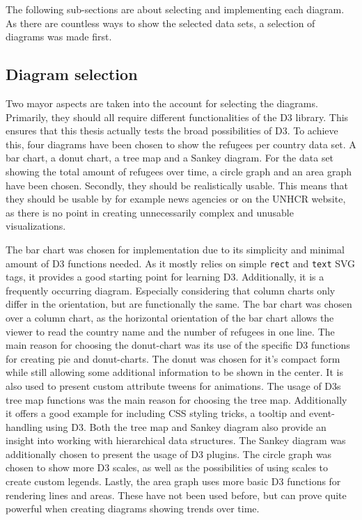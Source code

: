 The following sub-sections are about selecting and implementing each diagram. As there are countless ways to show the selected data sets, a selection of diagrams was made first.

\subsection{Diagram selection} \label{sec:diagram-selection}
Two mayor aspects are taken into the account for selecting the diagrams. Primarily, they should all require different functionalities of the D3 library. This ensures that this thesis actually tests the broad possibilities of D3. To achieve this, four diagrams have been chosen to show the refugees per country data set. A bar chart, a donut chart, a tree map and a Sankey diagram. For the data set showing the total amount of refugees over time, a circle graph and an area graph have been chosen.
Secondly, they should be realistically usable. This means that they should be usable by for example news agencies or on the UNHCR website, as there is no point in creating unnecessarily complex and unusable visualizations.

The bar chart was chosen for implementation due to its simplicity and minimal amount of D3 functions needed. As it mostly relies on simple \texttt{rect} and \texttt{text} SVG tags, it provides a good starting point for learning D3. Additionally, it is a frequently occurring diagram. Especially considering that column charts only differ in the orientation, but are functionally the same. The bar chart was chosen over a column chart, as the horizontal orientation of the bar chart allows the viewer to read the country name and the number of refugees in one line.
The main reason for choosing the donut-chart was its use of the specific D3 functions for creating pie and donut-charts. The donut was chosen for it's compact form while still allowing some additional information to be shown in the center. It is also used to present custom attribute tweens for animations.
The usage of D3s tree map functions was the main reason for choosing the tree map. Additionally it offers a good example for including CSS styling tricks, a tooltip and event-handling using D3.
Both the tree map and Sankey diagram also provide an insight into working with hierarchical data structures. The Sankey diagram was additionally chosen to present the usage of D3 plugins.
The circle graph was chosen to show more D3 scales, as well as the possibilities of using scales to create custom legends.
Lastly, the area graph uses more basic D3 functions for rendering lines and areas. These have not been used before, but can prove quite powerful when creating diagrams showing trends over time.

